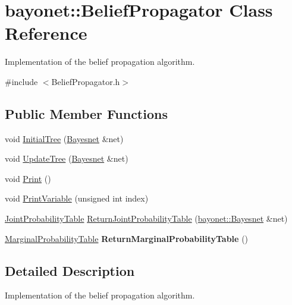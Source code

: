 \hypertarget{classbayonet_1_1_belief_propagator}{\section{bayonet\-:\-:Belief\-Propagator Class Reference}
\label{classbayonet_1_1_belief_propagator}
}


Implementation of the belief propagation algorithm.  




{\ttfamily \#include $<$Belief\-Propagator.\-h$>$}

\subsection*{Public Member Functions}
\begin{DoxyCompactItemize}
\item 
void \hyperlink{classbayonet_1_1_belief_propagator_ac9be764473228531c25af33db046d663}{Initial\-Tree} (\hyperlink{classbayonet_1_1_bayesnet}{Bayesnet} \&net)
\item 
void \hyperlink{classbayonet_1_1_belief_propagator_a8d66b5e99de3775df9beb17a084b9638}{Update\-Tree} (\hyperlink{classbayonet_1_1_bayesnet}{Bayesnet} \&net)
\item 
void \hyperlink{classbayonet_1_1_belief_propagator_ae593892ddb8eb9eb9787d487cbbce06c}{Print} ()
\item 
void \hyperlink{classbayonet_1_1_belief_propagator_af1fd526cb347a12091329dffbec6877e}{Print\-Variable} (unsigned int index)
\item 
\hyperlink{classbayonet_1_1_joint_probability_table}{Joint\-Probability\-Table} \hyperlink{classbayonet_1_1_belief_propagator_af758ccf83bf74fd701168ba0a6196671}{Return\-Joint\-Probability\-Table} (\hyperlink{classbayonet_1_1_bayesnet}{bayonet\-::\-Bayesnet} \&net)
\item 
\hypertarget{classbayonet_1_1_belief_propagator_a69b9392c66a93f611f37f40b6aa46fbc}{\hyperlink{classbayonet_1_1_marginal_probability_table}{Marginal\-Probability\-Table} {\bfseries Return\-Marginal\-Probability\-Table} ()}\label{classbayonet_1_1_belief_propagator_a69b9392c66a93f611f37f40b6aa46fbc}

\end{DoxyCompactItemize}


\subsection{Detailed Description}
Implementation of the belief propagation algorithm. 

